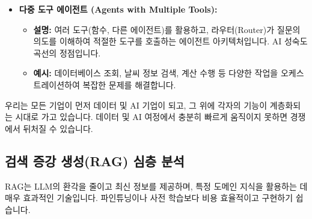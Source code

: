 \documentclass[11pt,a4paper]{article}
\begin{document}
\begin{itemize}
    \item \textbf{다중 도구 에이전트 (Agents with Multiple Tools):}
    \begin{itemize}
        \item \textbf{설명:} 여러 도구(함수, 다른 에이전트)를 활용하고, 라우터(Router)가 질문의 의도를 이해하여 적절한 도구를 호출하는 에이전트 아키텍처입니다. AI 성숙도 곡선의 정점입니다.
        \item \textbf{예시:} 데이터베이스 조회, 날씨 정보 검색, 계산 수행 등 다양한 작업을 오케스트레이션하여 복잡한 문제를 해결합니다.
    \end{itemize}
\end{itemize}

\begin{tcolorbox}[conceptbox={모든 기업은 데이터 및 AI 기업}]
    우리는 모든 기업이 먼저 데이터 및 AI 기업이 되고, 그 위에 각자의 기능이 계층화되는 시대로 가고 있습니다. 데이터 및 AI 여정에서 충분히 빠르게 움직이지 못하면 경쟁에서 뒤처질 수 있습니다.
\end{tcolorbox}

\subsection{검색 증강 생성(RAG) 심층 분석}

RAG는 LLM의 환각을 줄이고 최신 정보를 제공하며, 특정 도메인 지식을 활용하는 데 매우 효과적인 기술입니다. 파인튜닝이나 사전 학습보다 비용 효율적이고 구현하기 쉽습니다.
\end{document}
